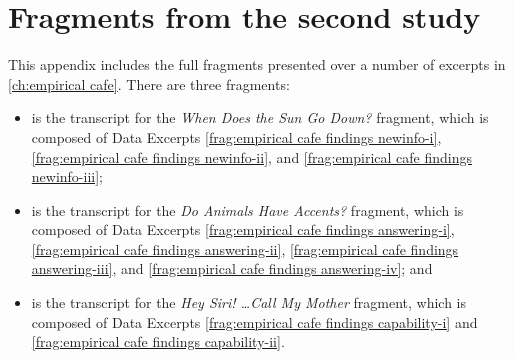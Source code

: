 


\chapter{Fragments from the second study}\label{app:fragments-cafe}



This appendix includes the full fragments presented over a number of excerpts in \autoref{ch:empirical cafe}. There are three fragments:

\begin{itemize}
    \item {} is the transcript for the \textit{When Does the Sun Go Down?} fragment, which is composed of Data Excerpts \ref{frag:empirical cafe findings newinfo-i}, \ref{frag:empirical cafe findings newinfo-ii}, and \ref{frag:empirical cafe findings newinfo-iii};
    \item {} is the transcript for the \textit{Do Animals Have Accents?} fragment, which is composed of Data Excerpts \ref{frag:empirical cafe findings answering-i}, \ref{frag:empirical cafe findings answering-ii}, \ref{frag:empirical cafe findings answering-iii}, and \ref{frag:empirical cafe findings answering-iv}; and
    \item {} is the transcript for the \textit{Hey Siri! \ldots Call My Mother} fragment, which is composed of Data Excerpts \ref{frag:empirical cafe findings capability-i} and \ref{frag:empirical cafe findings capability-ii}.
\end{itemize}


